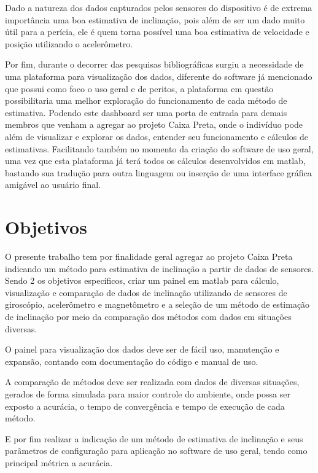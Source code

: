 Dado a natureza dos dados capturados pelos sensores do dispositivo é de extrema importância uma boa estimativa de inclinação, pois além de ser um dado muito útil para a perícia, ele é quem torna possível uma boa estimativa de velocidade e posição utilizando o acelerômetro.

Por fim, durante o decorrer das pesquisas bibliográficas surgiu a necessidade de uma plataforma para visualização dos dados, diferente do software já mencionado que possui como foco o uso geral e de peritos, a plataforma em questão possibilitaria uma melhor exploração do funcionamento de cada método de estimativa. Podendo este dashboard ser uma porta de entrada para demais membros que venham a agregar ao projeto Caixa Preta, onde o indivíduo pode além de visualizar e explorar os dados, entender seu funcionamento e cálculos de estimativas. Facilitando também no momento da criação do software de uso geral, uma vez que esta plataforma já terá todos os cálculos desenvolvidos em matlab, bastando sua tradução para outra linguagem ou inserção de uma interface gráfica amigável ao usuário final.


\section{Objetivos}
O presente trabalho tem por finalidade geral agregar ao projeto Caixa Preta indicando um método para estimativa de inclinação a partir de dados de sensores. Sendo 2 os objetivos específicos, criar um painel em matlab para cálculo, visualização e comparação de dados de inclinação utilizando de sensores de giroscópio, acelerômetro e magnetômetro e a seleção de um método de estimação de inclinação por meio da comparação dos métodos com dados em situações diversas.

O painel para visualização dos dados deve ser de fácil uso, manutenção e expansão, contando com documentação do código e manual de uso.

A comparação de métodos deve ser realizada com dados de diversas situações, gerados de forma simulada para maior controle do ambiente, onde possa ser exposto a acurácia, o tempo de convergência e tempo de execução de cada método.

E por fim realizar a indicação de um método de estimativa de inclinação e seus parâmetros de configuração para aplicação no software de uso geral, tendo como principal métrica a acurácia.

